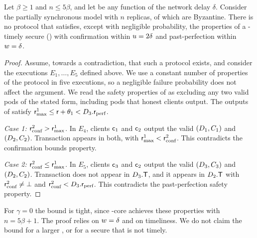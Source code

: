 \begin{theorem}\label{thm:lower-bound}
    Let $\beta \geq 1$ and $n \leq 5\beta$, and let \parTemp be any function of
    the network delay $\delta$.  Consider the partially synchronous model with
    $n$ replicas, \beta of which are Byzantine.  There is no protocol that
    satisfies, except with negligible probability, the properties of a
    \parTemp-timely secure \podtm () with
    confirmation within $u = 2\delta$ and past-perfection within
    $w = \delta$.
\end{theorem}
\begin{proof}
    Assume, towards a contradiction, that such a protocol exists, and consider the executions $E_1, \ldots, E_5$ defined above.
    We use a constant number of properties of the protocol in five executions, so a negligible failure probability does not affect the argument.
    We read the safety properties of  as excluding any two valid pods of the stated form, including pods that honest clients output.
    The outputs of  satisfy $\textsf{r}_\text{max}^1 \leq \textsf{r} + \theta_1 < D_3.\textsf{r}_\text{perf}$.

    \emph{Case 1: $\textsf{r}_\text{conf}^2 > \textsf{r}_\text{max}^1$.}
    In $E_4$, clients $\textsf{c}_1$ and $\textsf{c}_2$ output the valid $(D_1, C_1)$ and $(D_2, C_2)$.
    Transaction \tx appears in both, with $\textsf{r}_\text{max}^1 < \textsf{r}_\text{conf}^2$.
    This contradicts the confirmation bounds property.

    \emph{Case 2: $\textsf{r}_\text{conf}^2 \leq \textsf{r}_\text{max}^1$.}
    In $E_5$, clients $\textsf{c}_3$ and $\textsf{c}_2$ output the valid $(D_3, C_3)$ and $(D_2, C_2)$.
    Transaction \tx does not appear in $D_3.\textsf{T}$, and it appears in $D_2.\textsf{T}$ with $\textsf{r}_\text{conf}^2 \neq \bot$ and $\textsf{r}_\text{conf}^2 < D_3.\textsf{r}_\text{perf}$.
    This contradicts the past-perfection safety property.
\end{proof}

\begin{remark}
    For $\gamma = 0$ the bound is tight, since \podtm-core achieves these properties with $n = 5\beta + 1$.
    The proof relies on $w = \delta$ and on timeliness.
    We do not claim the bound for a larger \parPerf, or for a secure \podtm that is not timely.
\end{remark}
